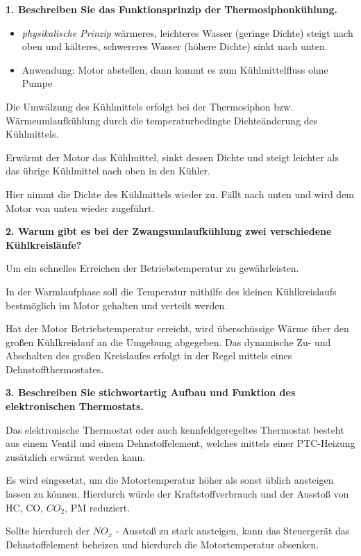 \textbf{1. Beschreiben Sie das Funktionsprinzip der
Thermosiphonkühlung.}

\begin{itemize}
\item
  \emph{physikalische Prinzip} wärmeres, leichteres Wasser (geringe
  Dichte) steigt nach oben und kälteres, schwereres Wasser (höhere
  Dichte) sinkt nach unten.
\item
  Anwendung: Motor abstellen, dann kommt es zum Kühlmittelfluss ohne
  Pumpe
\end{itemize}

Die Umwälzung des Kühlmittels erfolgt bei der Thermosiphon bzw.
Wärmeumlaufkühlung durch die temperaturbedingte Dichteänderung des
Kühlmittels.

Erwärmt der Motor das Kühlmittel, sinkt dessen Dichte und steigt
leichter als das übrige Kühlmittel nach oben in den Kühler.

Hier nimmt die Dichte des Kühlmittels wieder zu. Fällt nach unten und
wird dem Motor von unten wieder zugeführt.

\textbf{2. Warum gibt es bei der Zwangsumlaufkühlung zwei verschiedene
Kühlkreisläufe?}

Um ein schnelles Erreichen der Betriebstemperatur zu gewährleisten.

In der Warmlaufphase soll die Temperatur mithilfe des kleinen
Kühlkreislaufs bestmöglich im Motor gehalten und verteilt werden.

Hat der Motor Betriebstemperatur erreicht, wird überschüssige Wärme über
den großen Kühlkreislauf an die Umgebung abgegeben. Das dynamische Zu-
und Abschalten des großen Kreislaufes erfolgt in der Regel mittels eines
Dehnstoffthermostates.

\textbf{3. Beschreiben Sie stichwortartig Aufbau und Funktion des
elektronischen Thermostats.}

Das elektronische Thermostat oder auch kennfeldgeregeltes Thermostat
besteht aus einem Ventil und einem Dehnstoffelement, welches mittels
einer PTC-Heizung zusätzlich erwärmt werden kann.

Es wird eingesetzt, um die Motortemperatur höher als sonst üblich
ansteigen lassen zu können. Hierdurch würde der Kraftstoffverbrauch und
der Ausstoß von HC, CO, $CO_2$, PM reduziert.

Sollte hierdurch der $NO_x$ - Ausstoß zu stark ansteigen, kann das
Steuergerät das Dehnstoffelement beheizen und hierdurch die
Motortemperatur absenken.

